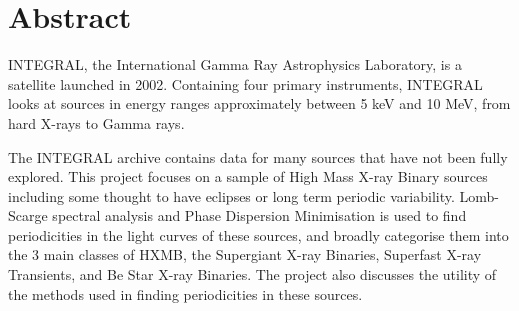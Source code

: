 

\begingroup
\let\clearpage\relax
\let\cleardoublepage\relax
\let\cleardoublepage\relax

\chapter*{Abstract} %

INTEGRAL, the International Gamma Ray Astrophysics Laboratory, is a satellite launched in 2002. Containing four primary instruments, INTEGRAL looks at sources in energy ranges approximately between 5 keV and 10 MeV, from hard X-rays to Gamma rays. 

The INTEGRAL archive contains data for many sources that have not been fully explored. This project focuses on a sample of High Mass X-ray Binary sources including some thought to have eclipses or long term periodic variability. Lomb-Scarge spectral analysis and Phase Dispersion Minimisation is used to find periodicities in the light curves of these sources, and broadly categorise them into the 3 main classes of HXMB, the Supergiant X-ray Binaries, Superfast X-ray Transients, and Be Star X-ray Binaries. The project also discusses the utility of the methods used in finding periodicities in these sources. 



\endgroup			

\vfill